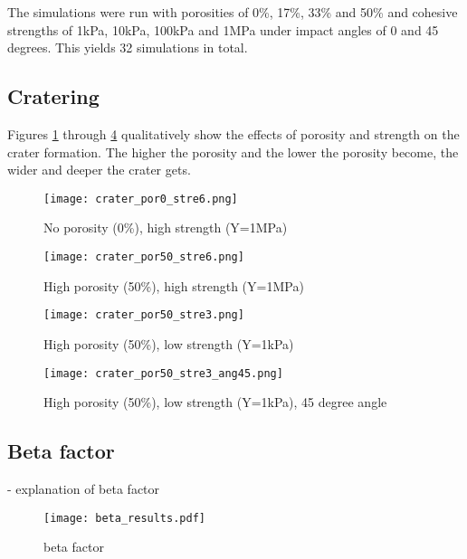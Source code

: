 The simulations were run with porosities of 0\%, 17\%, 33\% and 50\% and cohesive strengths of 1kPa, 10kPa, 100kPa and 1MPa under impact angles of 0 and 45 degrees. This yields 32 simulations in total.

\subsection{Cratering}
Figures \ref{fig:crater1} through \ref{fig:crater4} qualitatively show the effects of porosity and strength on the crater formation. The higher the porosity and the lower the porosity become, the wider and deeper the crater gets.

\begin{figure}[H]
   \centering
   \texttt{[image: crater\_por0\_stre6.png]}
   \caption{No porosity (0\%), high strength (Y=1MPa)}
   \label{fig:crater1}
\end{figure}

\begin{figure}[H]
   \centering
   \texttt{[image: crater\_por50\_stre6.png]}
   \caption{High porosity (50\%), high strength (Y=1MPa)}
   \label{fig:crater2}
\end{figure}

\begin{figure}[H]
   \centering
   \texttt{[image: crater\_por50\_stre3.png]}
   \caption{High porosity (50\%), low strength (Y=1kPa)}
   \label{fig:crater3}
\end{figure}

\begin{figure}[H]
   \centering
   \texttt{[image: crater\_por50\_stre3\_ang45.png]}
   \caption{High porosity (50\%), low strength (Y=1kPa), 45 degree angle}
   \label{fig:crater4}
\end{figure}


\subsection{Beta factor}
- explanation of beta factor

\begin{figure}[H]
   \centering
   \texttt{[image: beta\_results.pdf]}
   \caption{beta factor}
   \label{fig:beta_factor}
\end{figure}